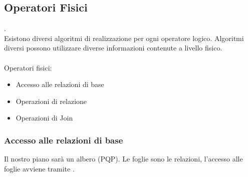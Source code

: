 \documentclass[12pt, a4paper]{report}
\begin{document}
    \subsection{Operatori Fisici}
    .\\ Esistono diversi algoritmi di realizzazione per ogni operatore logico. Algoritmi diversi possono utilizzare diverse informazioni contenute a livello fisico.\\
    \\
    Operatori fisici:
    \begin{itemize}
        \item Accesso alle relazioni di base
        \item Operazioni di relazione
        \item Operazioni di Join
    \end{itemize}
    \subsubsection{Accesso alle relazioni di base}
    Il nostro piano sarà un albero (PQP). Le foglie sono le relazioni, l'accesso alle foglie avviene tramite .
\end{document}
